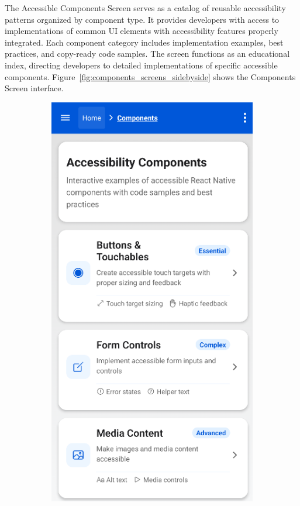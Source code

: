 The Accessible Components Screen serves as a catalog of reusable accessibility patterns organized by component type. It provides developers with access to implementations of common UI elements with accessibility features properly integrated. Each component category includes implementation examples, best practices, and copy-ready code samples. The screen functions as an educational index, directing developers to detailed implementations of specific accessible components. Figure~\ref{fig:components_screens_sidebyside} shows the Components Screen interface.

\begin{figure}[ht]
    \centering
    \begin{subfigure}[b]{0.48\textwidth}
        \centering
        \includegraphics[width=\linewidth, alt={First part of the Components Screen}]{img/components1.png}

\end{subfigure}
\end{figure}
